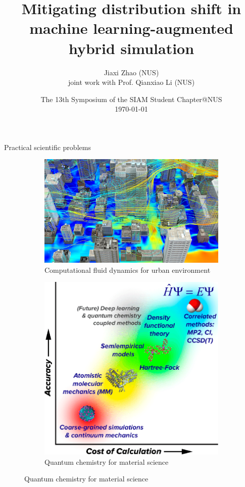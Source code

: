\documentclass[NUS-Kajima workshop]{beamer}
\title[Mitigating DS in SciML]{Mitigating distribution shift in machine learning-augmented hybrid simulation\footnotemark}
\author[J. Zhao]{Jiaxi Zhao (NUS) \\ \small joint work with Prof. Qianxiao Li (NUS)}
\date[\today]{The 13th Symposium of the SIAM Student Chapter@NUS \\ \today}
\begin{document}
\par \setlength{\parindent}{2em}

\begin{frame}
\titlepage
{}
\end{frame}


\begin{frame}{Practical scientific problems}
	\begin{figure}[ht]
		\centering
		\begin{subfigure}{0.5\linewidth} %
			\centering
			\includegraphics[width=\linewidth]{fig/urban_environment.jpeg}
			\caption{Computational fluid dynamics for urban environment}
		  \end{subfigure}%
		  \begin{subfigure}{0.5\linewidth} %
			\centering
			\includegraphics[width=\linewidth]{fig/quantum_chemisty.png}
			\caption{Quantum chemistry for material science}
		  \end{subfigure}
	\end{figure}
\end{frame}
\end{document}

